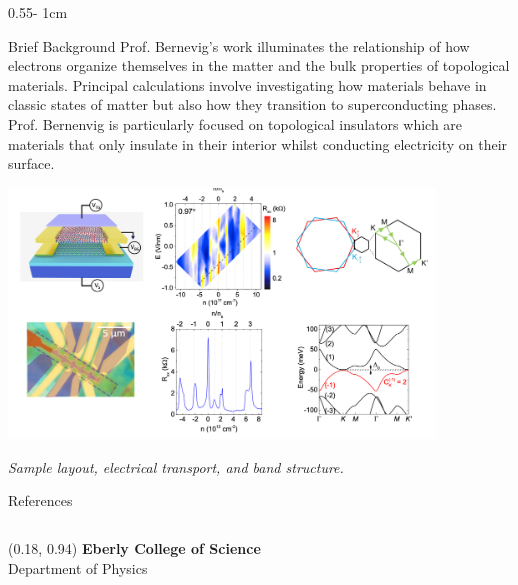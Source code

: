 \documentclass{../psuposter}
\begin{document}
\begin{frame}
\begin{columns}[t, totalwidth=\textwidth]
\begin{column}{0.55\textwidth - 1cm}
    \begin{block}{Brief Background}
    	Prof. Bernevig's work illuminates the relationship of how electrons organize themselves in the matter and the bulk properties of topological materials. Principal calculations involve investigating how materials behave in classic states of matter but also how they transition to superconducting phases. Prof. Bernenvig is particularly focused on topological insulators which are materials that only insulate in their interior whilst conducting electricity on their surface. \cite{wangTopologicalEdgeTransport2021}
        \begin{center}
		   	\includegraphics[width=0.85\textwidth]{images/background}
		   	
		   	\textit{Sample layout, electrical transport, and band structure.}\cite{wangTopologicalEdgeTransport2021}    		
    	\end{center}
    \end{block}


    \begin{block}{References}
    \nocite{*}
        
%        
		
    \end{block}

\end{column}
\end{columns}


\begin{textblock}{0.5}(0.18, 0.94)
    \color{white}
    \sffamily
    \textbf{Eberly College of Science}
    \\
    Department of Physics
\end{textblock}


\end{frame}
\end{document}
